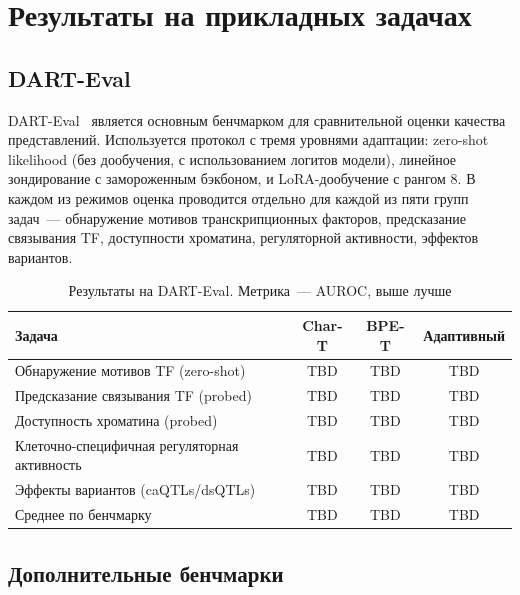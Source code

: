 \section{Результаты на прикладных задачах}

\subsection{DART-Eval}

DART-Eval~\cite{patel2025dartevalcomprehensivednalanguage} является
основным бенчмарком для сравнительной оценки качества представлений.
Используется протокол с тремя уровнями адаптации: zero-shot
likelihood (без дообучения, с использованием логитов модели), линейное
зондирование с замороженным бэкбоном, и LoRA-дообучение с рангом 8.
В каждом из режимов оценка проводится отдельно для каждой из пяти
групп задач~--- обнаружение мотивов транскрипционных факторов,
предсказание связывания TF, доступности хроматина, регуляторной
активности, эффектов вариантов.

\begin{table}[h]
\centering
\caption{Результаты на DART-Eval. Метрика~--- AUROC, выше лучше}
\label{tab:dart}
\begin{tabular}{lccc}
\toprule
Задача & Char-T & BPE-T & Адаптивный \\
\midrule
Обнаружение мотивов TF (zero-shot) & TBD & TBD & TBD \\
Предсказание связывания TF (probed) & TBD & TBD & TBD \\
Доступность хроматина (probed) & TBD & TBD & TBD \\
Клеточно-специфичная регуляторная активность & TBD & TBD & TBD \\
Эффекты вариантов (caQTLs/dsQTLs) & TBD & TBD & TBD \\
\midrule
Среднее по бенчмарку & TBD & TBD & TBD \\
\bottomrule
\end{tabular}
\end{table}

\subsection{Дополнительные бенчмарки}

